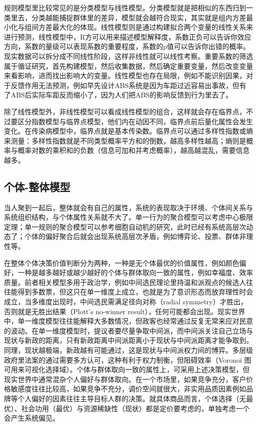 \documentclass[]{tufte-book}
\begin{document}
规则模型里比较常见的是分类模型与线性模型。分类模型就是把相似的东西归到一类里去，分类越能捕捉群体里的差异，模型就会越符合现实，其实就是组内方差最小化与组间方差最大化的体现。线性模型则是通过构建拟合两个变量的线性关系来进行预测，线性模型中，R方可以用来描述模型解释度，系数正负可以告诉你效应方向，系数的量级可以表现系数的重要程度，系数的p值可以告诉你出错的概率。现实数据可以拆分成不同线性阶段，这样非线性就可以线性考察。重要系数的筛选属于循证研究，首先构建模型，然后收集数据，然后确定重要变量，然后改变变量来看影响，进而找出影响大的变量。线性模型也存在局限，例如不能识别因果，对于反馈作用无法预测，例如早先设计ABS系统是因为车距过近容易出事故，但有了ABS后实际车距反而缩小了，因为人们把ABS的影响反馈到行为里去了。

除了线性模型外，非线性模型可以看成线性模型的组合，这样就会存在临界点，不过要区分指数模型与临界点模型，他们内在动因不同，临界点前后量化属性会发生变化。在传染病模型中，临界点就是基本传染数。临界点可以通过多样性指数或熵来测量：多样性指数就是不同类型概率平方和的倒数，越高多样性越高；熵则是概率与概率对数的乘积和的负数（信息可加和并考虑概率），越高越混乱，需要信息越多。

\hypertarget{ux4e2aux4f53-ux6574ux4f53ux6a21ux578b}{%
\subsection{个体-整体模型}\label{ux4e2aux4f53-ux6574ux4f53ux6a21ux578b}}

当人聚到一起后，整体就会有自己的属性，系统的表现取决于环境、个体间关系与系统组织结构，与个体属性关系就不大了。单一行为的聚合模型可以考虑中心极限定理；单一规则的聚合模型可以参考细胞自动机的研究，此时已经有系统高层次动态了；个体的偏好聚合后就会出现系统高层次矛盾，例如博弈论、投票、群体非理性等。

在整体个体决策价值判断分为两种，一种是无个体最优的价值属性，例如颜色偏好，一种是越多越好或越少越好的个体与群体取向一致的属性，例如幸福度、效率质量。前者相关模型多用于政治学，例如中间选民理论里持温和派观点的候选人往往能得到多数票，但这只在单一维度上成立，也就是为了意识形态而放弃理性时会成立，当多维度出现时，中间选民需满足径向对称（radial symmetry）才胜出，否则就是无胜出结果（Plott's no-winner result），任何可能都会出现。现实世界中，单一维度模型往往能解释大多数情况，但政客也经常通过反复无常来应对民意的波动。在单一维度模型时，提议者要尽量争取中间派，而中间派关注自己立场与现状与新政的距离，只有新政距离中间派距离小于现状与中间派距离才能争取到。同理，现状越极端，新政越有可能通过，这是现状与中间派权力间的博弈。多层级政府里法案的通过需要多方认可，这种有利于权力制衡，但阻碍效率（Voronoi 图可用来可视化选择域）。个体与群体取向一致的属性上，可采用上述决策模型，但现实世界中通常混杂个人偏好与群体取向。在一个市场里，如果竞争充分，客户价格敏感度往往比较高，如果竞争不充分，调价空间就很大，非实用品质因素例如品牌等个人偏好的因素往往主导目标人群的决策。就具体商品而言，个体选择（无最优）、社会功用（最优）与资源稀缺性（现状）都是定价要考虑的，单独考虑一个会产生系统偏见。
\end{document}
